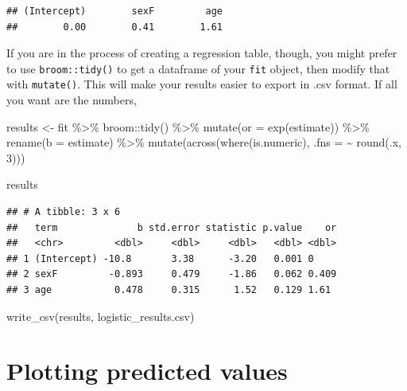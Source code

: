 \documentclass[
]{book}
\newenvironment{Shaded}{\begin{snugshade}}{\end{snugshade}}
\newcommand{\AttributeTok}[1]{\textcolor[rgb]{0.77,0.63,0.00}{#1}}
\newcommand{\DecValTok}[1]{\textcolor[rgb]{0.00,0.00,0.81}{#1}}
\newcommand{\FunctionTok}[1]{\textcolor[rgb]{0.00,0.00,0.00}{#1}}
\newcommand{\NormalTok}[1]{#1}
\newcommand{\OtherTok}[1]{\textcolor[rgb]{0.56,0.35,0.01}{#1}}
\newcommand{\SpecialCharTok}[1]{\textcolor[rgb]{0.00,0.00,0.00}{#1}}
\newcommand{\StringTok}[1]{\textcolor[rgb]{0.31,0.60,0.02}{#1}}
\begin{document}
\begin{verbatim}
## (Intercept)        sexF         age 
##        0.00        0.41        1.61
\end{verbatim}

If you are in the process of creating a regression table, though, you might prefer to use \texttt{broom::tidy()} to get a dataframe of your \texttt{fit} object, then modify that with \texttt{mutate()}. This will make your results easier to export in .csv format.
If all you want are the numbers,

\begin{Shaded}
\begin{Highlighting}[]
\NormalTok{results }\OtherTok{\textless{}{-}}\NormalTok{ fit }\SpecialCharTok{\%\textgreater{}\%} 
\NormalTok{  broom}\SpecialCharTok{::}\FunctionTok{tidy}\NormalTok{() }\SpecialCharTok{\%\textgreater{}\%} 
  \FunctionTok{mutate}\NormalTok{(}\AttributeTok{or =} \FunctionTok{exp}\NormalTok{(estimate)) }\SpecialCharTok{\%\textgreater{}\%} 
  \FunctionTok{rename}\NormalTok{(}\AttributeTok{b =}\NormalTok{ estimate) }\SpecialCharTok{\%\textgreater{}\%} 
  \FunctionTok{mutate}\NormalTok{(}\FunctionTok{across}\NormalTok{(}\FunctionTok{where}\NormalTok{(is.numeric), }\AttributeTok{.fns =} \SpecialCharTok{\textasciitilde{}} \FunctionTok{round}\NormalTok{(.x, }\DecValTok{3}\NormalTok{)))}

\NormalTok{results}
\end{Highlighting}
\end{Shaded}

\begin{verbatim}
## # A tibble: 3 x 6
##   term              b std.error statistic p.value    or
##   <chr>         <dbl>     <dbl>     <dbl>   <dbl> <dbl>
## 1 (Intercept) -10.8       3.38      -3.20   0.001 0    
## 2 sexF         -0.893     0.479     -1.86   0.062 0.409
## 3 age           0.478     0.315      1.52   0.129 1.61
\end{verbatim}

\begin{Shaded}
\begin{Highlighting}[]
\FunctionTok{write\_csv}\NormalTok{(results, }\StringTok{\textquotesingle{}logistic\_results.csv\textquotesingle{}}\NormalTok{)}
\end{Highlighting}
\end{Shaded}

\hypertarget{plotting-predicted-values}{%
\section{Plotting predicted values}\label{plotting-predicted-values}}
\end{document}
